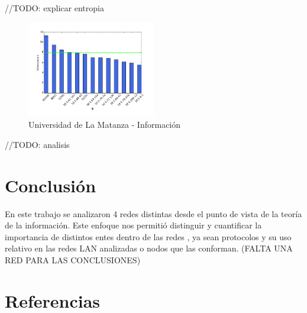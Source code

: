 \documentclass[final,inline,narroweqnarray,a4paper]{ieee}
\begin{document}
//TODO: explicar entropia

\begin{figure}[H]
    \begin{center}
        \includegraphics[width=0.5\textwidth]{plot/facultadS1_v3-bar.png}
        \caption{Universidad de La Matanza - Información}
        \label{histo:universidadLMS1}
    \end{center}
\end{figure}

//TODO: analisis

\section{Conclusión}
En este trabajo se analizaron 4 redes distintas desde el punto de vista de la teoría de la información. Este enfoque nos permitió distinguir y cuantificar la importancia de distintos entes dentro de las redes , ya sean protocolos y su uso relativo en las redes LAN analizadas o nodos que las conforman. (FALTA UNA RED PARA LAS CONCLUSIONES)


\section{Referencias}
\end{document}
